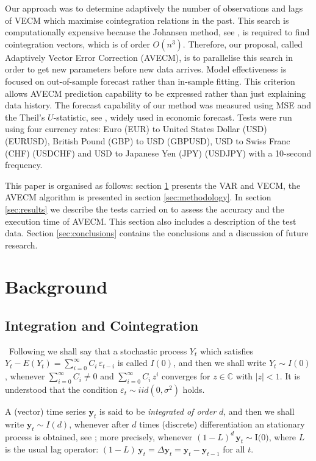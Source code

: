 Our approach was to determine adaptively the number of observations and lags of
VECM which maximise cointegration relations in the past.  This search is
computationally expensive because the Johansen method, see \cite{johansen1995},
is required to find cointegration vectors, which is of order $O(n^3)$.
Therefore, our proposal, called Adaptively Vector Error Correction (AVECM), is
to parallelise this search in order to get new parameters before new data
arrives.  Model effectiveness is focused on out-of-sample forecast rather than
in-sample fitting. This criterion allows AVECM prediction capability to be
expressed rather than just explaining data history.  The forecast capability of
our method was measured using MSE and the Theil's $U$-statistic, see
\cite{theil1966}, widely used in economic forecast. Tests were run using four
currency rates: Euro (EUR) to United States Dollar (USD) (EURUSD), British
Pound (GBP) to USD (GBPUSD), USD to Swiss Franc (CHF) (USDCHF) and USD to
Japanese Yen (JPY) (USDJPY) with a 10-second frequency.

This paper is organised as follows: section \ref{sec:background} presents the
VAR and VECM, the AVECM algorithm is presented in section \ref{sec:methodology}.
In section \ref{sec:results} we describe the tests carried on to assess the
accuracy and the execution time of AVECM.  This section also includes a
description of the test data.  Section \ref{sec:conclusions} contains the
conclusions and a discussion of future research.

\section{Background}
\label{sec:background}

\subsection{Integration and Cointegration}\label{sec:coint}\  
Following \cite{johansen1995} we shall say that a stochastic process
$Y_t$ which satisfies $Y_t-E(Y_t) = \sum_{i=0}^\infty C_i\,\varepsilon_{t-i}$ is
called $I(0)$, and then we shall write $Y_t\sim I(0)$, whenever
$\sum_{i=0}^\infty C_i \neq 0$ and $\sum_{i=0}^\infty C_i\,z^i$ converges for
$z\in\mathbb{C}$ with $|z|<1$.  It is understood that the condition
$\varepsilon_t\sim iid(0,\sigma^2)$ holds.

A (vector) time series $\mathbf{y}_t$ is said to be {\em integrated of order\/}
$d$, and then we shall write $\mathbf{y}_t\sim I(d)$, whenever after $d$ times
(discrete) differentiation an stationary process is
obtained, see \cite{banerjee1993}; more precisely, whenever
$(1-L)^d\,\mathbf{y}_t\sim\text{I(0)}$, where $L$ is the usual lag operator:
$(1-L)\,\mathbf{y}_t = \Delta\mathbf{y}_t = \mathbf{y}_t-\mathbf{y}_{t-1}$ for
all $t$.  


